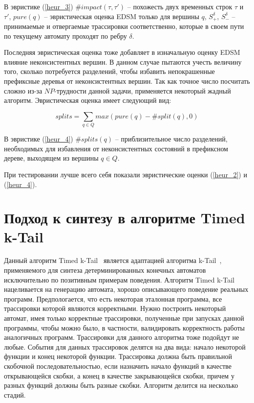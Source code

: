\documentclass[times,specification,annotation]{itmo-student-thesis}
\begin{document}
В эвристике (\ref{heur_3}) $\#impact(\tau, \tau')$ -- похожесть двух временных строк $\tau$ и $\tau'$, $pure(q)$ -- эвристическая оценка EDSM только для вершины $q$, 
$S^\delta_+$, $S^\delta_-$ -- принимаемые и отвергаемые трассировки соответственно, которые в своем пути по текущему автомату проходят по ребру $\delta$.

Последняя эвристическая оценка тоже добавляет в изначальную оценку EDSM влияние неконсистентных вершин. В данном случае пытаются учесть величину того,
сколько потребуется разделений, чтобы избавить непокрашенные префиксные деревья от неконсистентных вершин. Так как точное число посчитать сложно из-за $NP$-трудности
данной задачи, применяется некоторый жадный алгоритм. Эвристическая оценка имеет следующий вид:

\begin{equation}
  splits = \mathop{\sum}\limits_{q \in Q}max(pure(q) - \#split(q), 0)
  \label{heur_4}
\end{equation}

В эвристике (\ref{heur_4}) $\#splits(q)$ -- приблизительное число разделений, необходимых для избавления от неконсистентных состояний в префиксном дереве, выходящем из вершины $q \in Q$.

При тестировании лучше всего себя показали эвристические оценки (\ref{heur_2}) и (\ref{heur_4}).

\section{Подход к синтезу в алгоритме Timed k-Tail}

Данный алгоритм Timed k-Tail~\cite{timed-k-tail} является адаптацией алгоритма k-Tail~\cite{k-tail}, применяемого для синтеза детерминированных конечных автоматов 
исключительно по позитивным примерам поведения. 
Алгоритм Timed k-Tail нацеливается на генерацию автомата, хорошо описывающего поведение реальных программ. Предпологается, что есть некоторая эталонная программа, 
все трассировки которой являются корректными. Нужно построить некоторый автомат, имея только корректные трассировки, полученные при запусках данной программы, чтобы
можно было, в частности, валидировать корректность работы аналогичных программ. Трассировки для данного алгоритма тоже подойдут не любые.
События для данных трассировок делятся на два вида: начало некоторой функции и конец некоторой функции. Трассировка должна быть правильной скобочной последовательностью, если назначить 
начало функций в качестве открывающейся скобки, а конец в качестве закрывающейся скобки, причем у разных функций должны быть разные скобки.
Алгоритм делится на несколько стадий.
\end{document}
